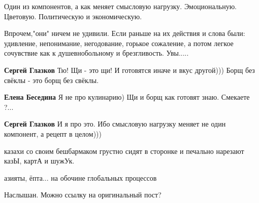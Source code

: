 \begin{itemize}
Один из компонентов, а как меняет смысловую
нагрузку. Эмоциональную. Цветовую. Политическую и экономическую.

Впрочем,"они" ничем не удивили. Если раньше на их действия и слова были:
удивление, непонимание, негодование, горькое сожаление, а потом легкое сочувствие
как к душевнобольному и брезгливость. Увы.....

\begin{itemize}
 
\textbf{Сергей Глазков} Тю! Щи - это щи! И готовятся иначе и вкус другой))) Борщ без свёклы - это борщ без свёклы.

 
\textbf{Елена Беседина} Я не про кулинарию) Щи и борщ как готовят знаю. Смекаете ?...

 
\textbf{Сергей Глазков} И я про это. Ибо смысловую нагрузку меняет не один компонент, а рецепт в целом)))
\end{itemize}

 

казахи со своим бешбармаком грустно сидят в сторонке и печально нарезают казЫ, картА и шужУк.

азияты, ёпта... на обочине глобальных процессов


 

Наслышан. Можно ссылку на оригинальный пост?


\end{itemize}

